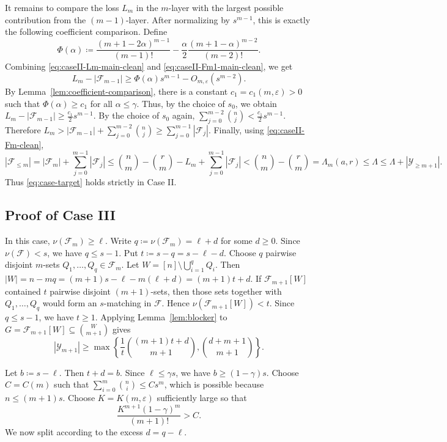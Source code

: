 \documentclass[10pt,a4paper]{article}
\numberwithin{equation}{section}
\theoremstyle{definition}
\newcommand{\F}{\mathcal F}
\newcommand{\Y}{\mathcal Y}
\begin{document}
It remains to compare the loss $L_m$ in the $m$-layer with the largest possible contribution from the $(m-1)$-layer.  After
normalizing by $s^{m-1}$, this is exactly the following coefficient
comparison.
Define
\[
    \Phi(\alpha)\coloneqq
    \frac{(m+1-2\alpha)^{m-1}}{(m-1)!}
    -
    \frac{\alpha}{2}
    \frac{(m+1-\alpha)^{m-2}}{(m-2)!}.
\]
Combining \eqref{eq:caseII-Lm-main-clean} and
\eqref{eq:caseII-Fm1-main-clean}, we get
\[
    L_m-|\F_{m-1}|
    \ge
    \Phi(\alpha)s^{m-1}
    -
    O_{m,\varepsilon}(s^{m-2}).
\]
By Lemma~\ref{lem:coefficient-comparison}, there is a constant
\(c_1=c_1(m,\varepsilon)>0\) such that $\Phi(\alpha)\ge c_1$ for all $\alpha\le\gamma$.
Thus, by the choice of \(s_0\), we obtain
\(L_m-|\F_{m-1}| \ge \frac{c_1}{2}s^{m-1}.\)
By the choice of \(s_0\) again,
\(\sum_{j=0}^{m-2}\binom nj < \frac{c_1}{2}s^{m-1}.\)
Therefore
\(L_m> |\F_{m-1}|+\sum_{j=0}^{m-2}\binom nj \ge \sum_{j=0}^{m-1}|\F_j|.\)
Finally, using \eqref{eq:caseII-Fm-clean},
\[
    |\F_{\le m}|
    =
    |\F_m|+\sum_{j=0}^{m-1}|\F_j|  \le
    \binom nm-\binom rm-L_m+\sum_{j=0}^{m-1}|\F_j|<
    \binom nm-\binom rm  =
    \Lambda_m(a,r)
    \le
    \Lambda
    \le
    \Lambda+|\Y_{\ge m+1}|.
\]
Thus \eqref{eq:case-target} holds strictly in Case II.


\subsection{Proof of Case III}

In this case, \(\nu(\F_m)\ge \ell\).
Write $q\coloneqq \nu(\F_m)=\ell+d$ for some \(d\ge0\).
Since \(\nu(\F)<s\), we have \(q\le s-1\).  Put
\(t\coloneqq s-q=s-\ell-d.\)
Choose \(q\) pairwise disjoint \(m\)-sets $Q_1,\ldots,Q_q\in\F_m$.
Let
\(W=[n]\setminus\bigcup_{i=1}^q Q_i.\)
Then
\(|W| = n-mq = (m+1)s-\ell-m(\ell+d) = (m+1)t+d.\)
If \(\F_{m+1}[W]\) contained \(t\) pairwise disjoint \((m+1)\)-sets, then
those sets together with \(Q_1,\ldots,Q_q\) would form an \(s\)-matching in
\(\F\).  Hence
\(\nu(\F_{m+1}[W])<t.\)
Since \(q\le s-1\), we have \(t\ge1\).  Applying
Lemma~\ref{lem:blocker} to
\(G=\F_{m+1}[W]\subseteq\binom W{m+1}\)
gives
\begin{equation}\label{eq:caseIII-blocker-new}
    |\Y_{m+1}|
    \ge
    \max\left\{
    \frac1t\binom{(m+1)t+d}{m+1},
    \binom{d+m+1}{m+1}
    \right\}.
\end{equation}

Let
\(b\coloneqq s-\ell.\)
Then \(t+d=b\).  Since \(\ell\le\gamma s\), we have
\(b\ge(1-\gamma)s.\)
Choose \(C=C(m)\) such that $\sum_{i=0}^{m}\binom ni\le Cs^m$, which is possible because \(n\le(m+1)s\).  Choose
\(K=K(m,\varepsilon)\) sufficiently large so that
\begin{equation}\label{eq:caseIII-K-choice}
    \frac{K^{m+1}(1-\gamma)^m}{(m+1)!}>C.
\end{equation}
We now split according to the excess \(d=q-\ell\).
\end{document}
